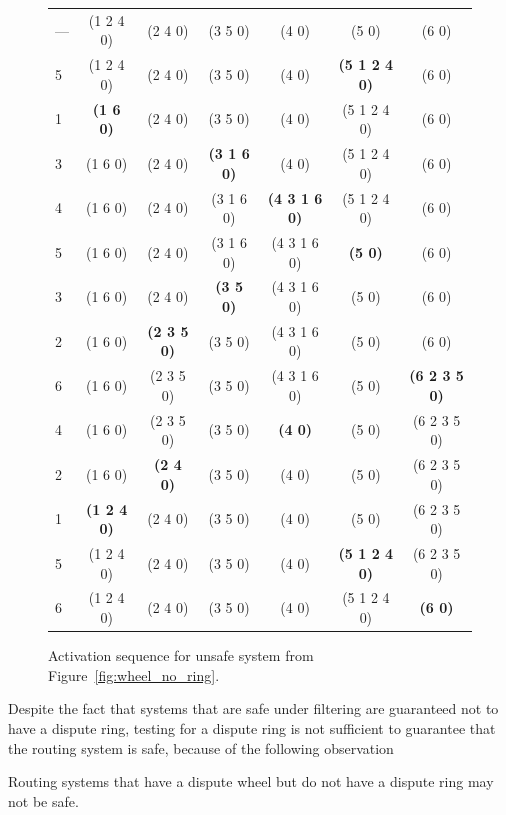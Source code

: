 \begin{figure}[t]
\begin{center}
\begin{tabular}{l|cccccc}
--- & (1 2 4 0) & (2 4 0) & (3 5 0) & (4 0) & (5 0) & (6 0) \\ 
5 &  (1 2 4 0) & (2 4 0) & (3 5 0) & (4 0) & {\bf (5 1 2 4 0)} & (6 0)
\\ 
1 &  {\bf (1 6 0)} & (2 4 0) & (3 5 0) & (4 0) & (5 1 2 4 0) & (6 0) \\ 
3 &  (1 6 0) & (2 4 0) & {\bf (3 1 6 0)} & (4 0) & (5 1 2 4 0) & (6 0)
\\ 
4 &  (1 6 0) & (2 4 0) & (3 1 6 0) & {\bf (4 3 1 6 0)} & (5 1 2 4 0) &
(6 0) \\  
5 &  (1 6 0) & (2 4 0) & (3 1 6 0) & (4 3 1 6 0) & {\bf (5 0)} & (6 0) \\ 
3 &  (1 6 0) & (2 4 0) & {\bf (3 5 0)} & (4 3 1 6 0) & (5 0) & (6 0) \\ 
2 &  (1 6 0) & {\bf (2 3 5 0)} & (3 5 0) & (4 3 1 6 0) & (5 0) & (6 0)
\\ 
6 &  (1 6 0) & (2 3 5 0) & (3 5 0) & (4 3 1 6 0) & (5 0) & {\bf (6 2 3 5
  0)} \\ 
4 &  (1 6 0) & (2 3 5 0) & (3 5 0) & {\bf (4 0)} & (5 0) & (6 2 3 5 0)
\\ 
2 &  (1 6 0) & {\bf (2 4 0)} & (3 5 0) & (4 0) & (5 0) & (6 2 3 5 0) \\ 
1 &  {\bf (1 2 4 0)} & (2 4 0) & (3 5 0) & (4 0) & (5 0) & (6 2 3 5 0)
\\ 
5 &  (1 2 4 0) & (2 4 0) & (3 5 0) & (4 0) & {\bf (5 1 2 4 0)} & (6 2 3
5 0) \\  
6 &  (1 2 4 0) & (2 4 0) & (3 5 0) & (4 0) & (5 1 2 4 0) & {\bf (6
  0)} \\   
\end{tabular}
\end{center}
\caption{Activation sequence for unsafe system from
  Figure~\ref{fig:wheel_no_ring}.}  
\label{fig:wheel_no_ring_activation}
\end{figure}



Despite the fact that systems that are safe under filtering are
guaranteed not to have a dispute ring, testing for a dispute ring is
not sufficient to guarantee that the routing system is safe, because of
the following observation


\begin{observation}
Routing systems that have a dispute wheel but do not
have a dispute ring may not be safe. 
\end{observation}





